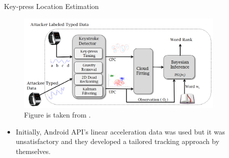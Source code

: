 \documentclass[ucs,9pt,usenames,dvipsnames]{beamer}
\begin{document}
\begin{frame}{Key-press Location Estimation}
	\begin{figure}
		\centering
		\includegraphics[width=10cm]{imgs/moleOverview}
		\caption{Figure is taken from \cite{b1}.}
	\end{figure}
	\begin{itemize}
		\item Initially, Android API's linear acceleration data was used but it was unsatisfactory and they developed a tailored tracking approach by themselves. 
	\end{itemize}
\end{frame}
\end{document}
